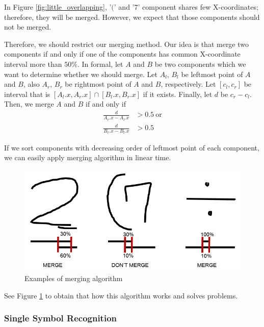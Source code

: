 \documentclass[10pt,twocolumn,letterpaper]{article}
\begin{document}
In Figure \ref{fig:little_overlapping}, '$($' and '$7$' component shares few X-coordinates;
therefore, they will be merged.
However, we expect that those components should not be merged.

Therefore, we should restrict our merging method. Our idea is that merge two components
if and only if one of the components has common X-coordinate interval more than $50\%$.
In formal, let $A$ and $B$ be two components which we want to determine whether we should merge.
Let $A_l$, $B_l$ be leftmost point of $A$ and $B$, also $A_r$, $B_r$ be rightmost point of $A$ and $B$, respectively.
Let $[c_l, c_r]$ be interval that is $[A_l.x, A_r.x] \cap [B_l.x, B_r.x]$ if it exists.
Finally, let $d$ be $c_r - c_l$.
Then, we merge $A$ and $B$ if and only if
\begin{subequations}
\label{eq:mergecondition}
\begin{align}
    \frac{d}{A_r.x - A_l.x} &> 0.5 \ \text{or} \\
    \frac{d}{B_r.x - B_l.x} &> 0.5
\end{align}
\end{subequations}

If we sort components with decreasing order of leftmost point of each component,
we can easily apply merging algorithm in linear time.

\begin{figure}[t]
    \begin{center}
        \includegraphics[width=0.8\linewidth]{img/merging.png}
    \end{center}
    \caption{Examples of merging algorithm}
    \label{fig:merging}
\end{figure}

See Figure \ref{fig:merging} to obtain that how this algorithm works and solves problems.

\subsubsection{Single Symbol Recognition}
\end{document}
